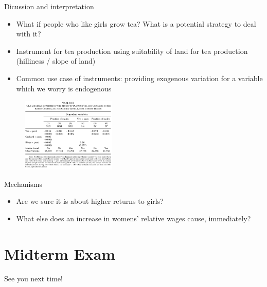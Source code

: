 \documentclass[11pt,notes=hide,aspectratio=169,mathserif]{beamer}
\begin{document}
\begin{frame}{Dicussion and interpretation}
\begin{itemize}
\item What if people who like girls grow tea? What is a potential strategy to deal with it?
\pause \item Instrument for tea production using suitability of land for tea production (hilliness / slope of land)
\pause \item Common use case of instruments: providing exogenous variation for a variable which we worry is endogenous
\end{itemize}
\begin{figure}
\centering
\includegraphics[width=0.4\textwidth]{inputs/table3.png}
\end{figure}
\end{frame}

\begin{frame}{Mechanisms}
\begin{itemize}
\item Are we sure it is about higher returns to girls?
\pause \item What else does an increase in womens’ relative wages cause, immediately?
\end{itemize}
\end{frame}

\section*{Midterm Exam}

\begin{frame}
\begin{center}{\LARGE See you next time!}\end{center}
\end{frame}
\end{document}
